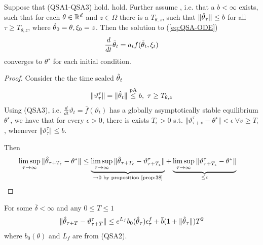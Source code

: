 
\begin{theorem}\label{thm:39}
    Suppose that (QSA1-QSA3) hold. %
    hold. Further assume , i.e. that a \(b<\infty\) exists,
    such that for each \(\theta\in \mathbb{R}^d\) and \(z\in\Omega\) there is a \(T_{\theta,z}\),
    such that \(\Vert {\hat{\theta}}_\tau \Vert \leq b\) for all \(\tau\geq T_{\theta,z}\), where 
    \({\hat{\theta}}_0=\theta,\xi_0=z\). Then the solution to (\ref{eq:QSA-ODE}) %
    \[\frac{d}{dt}{\tilde{\theta}}_t=a_t f({\tilde{\theta}}_t,\xi_t)\] 
    converges to \(\theta^\star\) for each initial condition.
\end{theorem} 

\begin{proof}
    Consider the the time scaled \({\hat{\theta}}_t\)
    \begin{align*}
        \Vert \vartheta_{\tau}^\tau\Vert = \Vert {\hat{\theta}}_t\Vert \stackrel{\text{pA}}{\leq} b,\ \tau\geq T_{\theta,z}
    \end{align*}
    Using (QSA3), i.e. \(\frac{d}{dt}\vartheta_t=\bar{f}(\vartheta_t)\) has a globally asymptotically stable
    equilibrium \(\theta^\star\), we have that for every \(\epsilon>0\), there is exists 
    \(T_\epsilon>0\) s.t. \(\Vert \vartheta_{\tau+v}^\tau-\theta^\star\Vert<\epsilon\ \forall v\geq T_\epsilon\), %
    whenever \(\Vert \vartheta_\tau^\tau\Vert \leq b\).

    Then 
    \begin{align*}
        \limsup_{\tau\to\infty} \Vert {\hat{\theta}}_{\tau+T_\epsilon}-\theta^\star\Vert &\leq \underbrace{\limsup_{\tau\to\infty}\Vert {\hat{\theta}}_{\tau+T_\epsilon}-\vartheta_{\tau+T_\epsilon}^\tau\Vert}_{\to 0 \text{ by proposition \ref{prop:38}}} + \underbrace{\limsup_{\tau\to\infty}\Vert \vartheta_{\tau+T_\epsilon}^\tau-\theta^\star\Vert}_{\leq \epsilon} \qedhere
    \end{align*}
\end{proof}

\begin{lemma}\label{lem:40}
    For some \(\bar{\delta}<\infty\) and any \(0\leq T\leq 1\)
    \[\Vert {\hat{\theta}}_{\tau+T}-\vartheta_{\tau+T}^\tau\Vert \leq e^{L_f}b_0({\hat{\theta}}_\tau)\epsilon_{\tau}^f+\bar{b}(1+\Vert {\hat{\theta}}_\tau\Vert)T^2\]
    where \(b_0(\theta)\) and \(L_f\) are from (QSA2).
\end{lemma}

